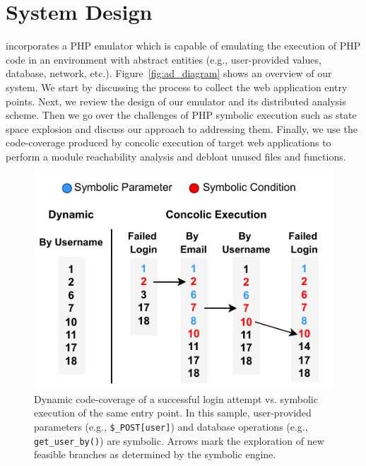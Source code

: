 \section{System Design} 
\animatedead{} incorporates a PHP emulator which is capable of emulating the execution of PHP code in an environment with abstract entities (e.g., user-provided values, database, network, etc.). 
Figure~\ref{fig:ad_diagram} shows an overview of our system. 
We start by discussing the process to collect the web application entry points. 
Next, we review the design of our emulator and its distributed analysis scheme. 
Then we go over the challenges of PHP symbolic execution such as state space explosion and discuss our approach to addressing them. 
Finally, we use the code-coverage produced by concolic execution of target web applications to perform a module reachability analysis and debloat unused files and functions. 

\begin{figure}[t]
	\centering
	\includegraphics[width=0.5\linewidth]{figures/ad/code_sample_concolic.pdf}
	\caption{Dynamic code-coverage of a successful login attempt vs. symbolic execution of the same entry point. In this sample, user-provided parameters (e.g., \texttt{\$\_POST[\textquotesingle{}user\textquotesingle{}]}) and database operations (e.g., \texttt{get\_user\_by()}) are symbolic. Arrows mark the exploration of new feasible branches as determined by the symbolic engine.}
	\label{fig:concolic_coverage}
\end{figure}

